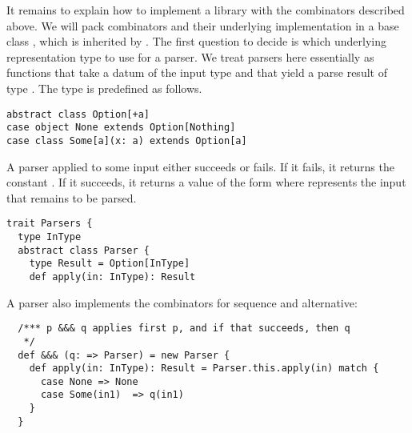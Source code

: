 {It remains to explain how to implement a library with the combinators
described above. We will pack combinators and their underlying
implementation in a base class , which is inherited by
.  The first question to decide is which underlying
representation type to use for a parser. We treat parsers here
essentially as functions that take a datum of the input type
 and that yield a parse result of type
.  The  type is predefined as
follows.
\begin{lstlisting}
abstract class Option[+a]
case object None extends Option[Nothing]
case class Some[a](x: a) extends Option[a]
\end{lstlisting}
A parser applied to some input either succeeds or fails. If it fails,
it returns the constant . If it succeeds, it returns a
value of the form  where  represents the
input that remains to be parsed.
\begin{lstlisting}
trait Parsers {
  type InType
  abstract class Parser {
    type Result = Option[InType]
    def apply(in: InType): Result
\end{lstlisting}
A parser also implements the combinators
for sequence and alternative:
\begin{lstlisting}
  /*** p &&& q applies first p, and if that succeeds, then q
   */
  def &&& (q: => Parser) = new Parser {
    def apply(in: InType): Result = Parser.this.apply(in) match {
      case None => None
      case Some(in1)  => q(in1)
    }
  }


\end{lstlisting}}

